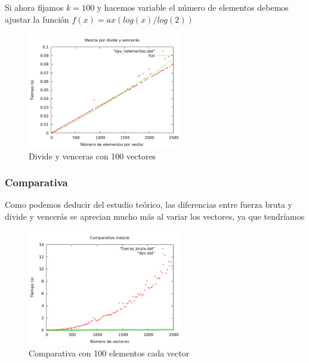Si ahora fijamos $k=100$ y hacemos variable el n\'umero de elementos debemos ajustar la funci\'on $f(x) = ax(log(x)/log(2))$

\begin{center}
\end{center}

\begin{figure}[htb] 
\centering
	\includegraphics[width=0.6\textwidth]{../Obligatorio/Graficas/dyv_nelementos.png}
	\caption{Divide y venceras con 100 vectores} 
	\label{fig:d_nelementos} 
\end{figure}
\newpage

\subsubsection{Comparativa}
Como podemos deducir del estudio te\'orico, las diferencias entre fuerza bruta y divide y vencer\'as se aprecian mucho m\'as al variar los vectores, ya que tendr\'iamos 
\begin{figure}[htb] 
\centering
	\includegraphics[width=0.6\textwidth]{../Obligatorio/Graficas/comparativa_kvectores.png}
	\caption{Comparativa con 100 elementos cada vector} 
	\label{fig:comp_kvectores} 
\end{figure}

